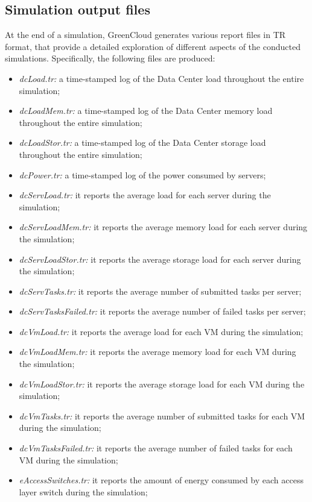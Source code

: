 \subsection{Simulation output files}
At the end of a simulation, GreenCloud generates various report files in TR format, that provide a detailed exploration of different aspects of the conducted simulations. Specifically, the following files are produced:
\begin{itemize}
    \item \emph{dcLoad.tr:} a time-stamped log of the Data Center load throughout the entire simulation;
    \item \emph{dcLoadMem.tr:} a time-stamped log of the Data Center memory load throughout the entire simulation;
    \item \emph{dcLoadStor.tr:} a time-stamped log of the Data Center storage load throughout the entire simulation;
    \item \emph{dcPower.tr:} a time-stamped log of the power consumed by servers;
    \item \emph{dcServLoad.tr:} it reports the average load for each server during the simulation;
    \item \emph{dcServLoadMem.tr:} it reports the average memory load for each server during the simulation;
    \item \emph{dcServLoadStor.tr:} it reports the average storage load for each server during the simulation;
    \item \emph{dcServTasks.tr:} it reports the average number of submitted tasks per server;
    \item \emph{dcServTasksFailed.tr:} it reports the average number of failed tasks per server;
    \item \emph{dcVmLoad.tr:} it reports the average load for each VM during the simulation;
    \item \emph{dcVmLoadMem.tr:} it reports the average memory load for each VM during the simulation;
    \item \emph{dcVmLoadStor.tr:} it reports the average storage load for each VM during the simulation;
    \item \emph{dcVmTasks.tr:} it reports the average number of submitted tasks for each VM during the simulation;
    \item \emph{dcVmTasksFailed.tr:} it reports the average number of failed tasks for each VM during the simulation;
    \item \emph{eAccessSwitches.tr:} it reports the amount of energy consumed by each access layer switch during the simulation;

\end{itemize}
